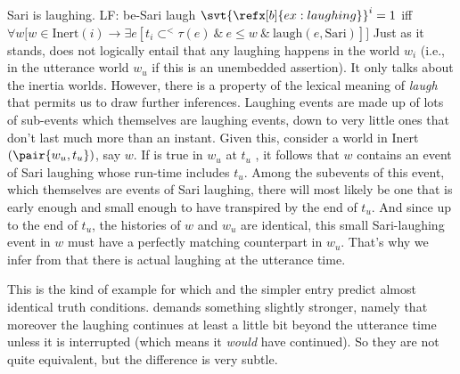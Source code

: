 \pex\label{ex:laughing}
\a Sari is laughing.
\a LF: \lb[TP] \pres \lb[AspP] be-\prog \lb[VP] Sari laugh \rb \rb \rb
\a $\svt{\refx[b]{ex:laughing}}^{i} = 1$ iff\\
$\forall w \bigl[ w \in \text{Inert}(i) \rightarrow \exists e [t_{i} \subset^{<}
\tau(e)\ \&\ e \le w\ \&\ \text{laugh}(e,\text{Sari})]\bigr]$
\xe
%
Just as it stands, \Last[c] does not logically entail that any laughing happens
in the world $w_{i}$ (i.e., in the utterance world $w_{u}$ if this is an
unembedded assertion). It only talks about the inertia worlds. However, there is
a property of the lexical meaning of \emph{laugh} that permits us to draw
further inferences. Laughing events are made up of lots of sub-events which
themselves are laughing events, down to very little ones that don't last much
more than an instant. Given this, consider a world in Inert$(\pair{w_{u},t_{u}})$, say
$w$. If \Last[b] is true in $w_{u}$ at $t_{u}$ , it follows that $w$ contains an
event of Sari laughing whose run-time includes $t_{u}$. Among the subevents of
this event, which themselves are events of Sari laughing, there will most likely
be one that is early enough and small enough to have transpired by the end of
$t_{u}$. %
%
And since up to the end of $t_{u}$, the histories of $w$ and $w_{u}$ are
identical, this small Sari-laughing event in $w$ must have a perfectly matching
counterpart in $w_{u}$. That's why we infer from \Last[a] that there is actual
laughing at the utterance time.

This is the kind of example for which  and the simpler entry
 predict almost identical truth conditions.
 demands something slightly stronger, namely that moreover
the laughing continues at least a little bit beyond the utterance time unless it
is interrupted (which means it \emph{would} have continued). So they are not
quite equivalent, but the difference is very subtle.

